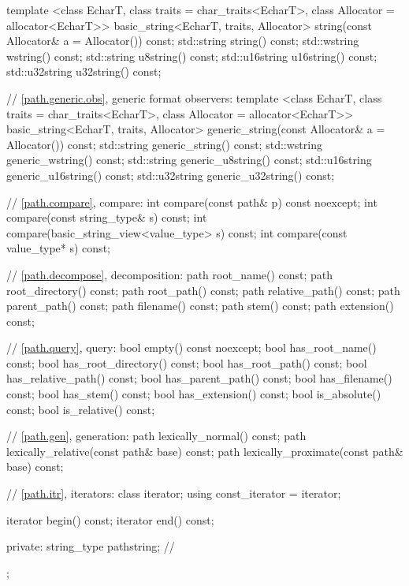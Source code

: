 \begin{codeblock}
{{    template <class EcharT, class traits = char_traits<EcharT>,
              class Allocator = allocator<EcharT>>
      basic_string<EcharT, traits, Allocator>
        string(const Allocator& a = Allocator()) const;
    std::string    string() const;
    std::wstring   wstring() const;
    std::string    u8string() const;
    std::u16string u16string() const;
    std::u32string u32string() const;

    // \ref{path.generic.obs}, generic format observers:
    template <class EcharT, class traits = char_traits<EcharT>,
              class Allocator = allocator<EcharT>>
      basic_string<EcharT, traits, Allocator>
        generic_string(const Allocator& a = Allocator()) const;
    std::string    generic_string() const;
    std::wstring   generic_wstring() const;
    std::string    generic_u8string() const;
    std::u16string generic_u16string() const;
    std::u32string generic_u32string() const;

    // \ref{path.compare}, compare:
    int  compare(const path& p) const noexcept;
    int  compare(const string_type& s) const;
    int  compare(basic_string_view<value_type> s) const;
    int  compare(const value_type* s) const;

    // \ref{path.decompose}, decomposition:
    path root_name() const;
    path root_directory() const;
    path root_path() const;
    path relative_path() const;
    path parent_path() const;
    path filename() const;
    path stem() const;
    path extension() const;

    // \ref{path.query}, query:
    bool empty() const noexcept;
    bool has_root_name() const;
    bool has_root_directory() const;
    bool has_root_path() const;
    bool has_relative_path() const;
    bool has_parent_path() const;
    bool has_filename() const;
    bool has_stem() const;
    bool has_extension() const;
    bool is_absolute() const;
    bool is_relative() const;

    // \ref{path.gen}, generation:
    path lexically_normal() const;
    path lexically_relative(const path& base) const;
    path lexically_proximate(const path& base) const;

    // \ref{path.itr}, iterators:
    class iterator;
    using const_iterator = iterator;

    iterator begin() const;
    iterator end() const;

  private:
    string_type pathstring; // \expos
  };
}
\end{codeblock}


